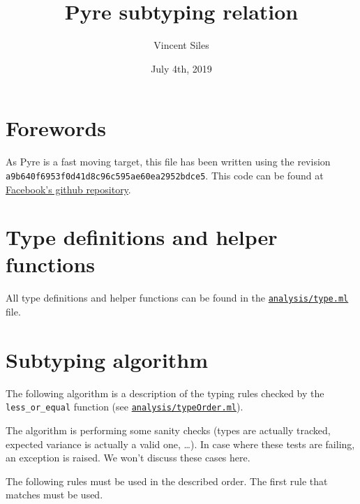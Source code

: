 \documentclass[a4paper]{article}
\newcommand{\PyreRevision}{a9b640f6953f0d41d8c96c595ae60ea2952bdce5}
\begin{document}
\title{Pyre subtyping relation}
\date{July 4th, 2019}
\author{Vincent Siles}

\maketitle

\section{Forewords}
As Pyre is a fast moving target, this file has been written using the revision
\texttt{\PyreRevision}.  This code can be found
at \href{https://github.com/facebook/pyre-check}{Facebook's github repository}.

\section{Type definitions and helper functions}
All type definitions and helper functions can be found in the
\href{https://github.com/facebook/pyre-check/tree/\PyreRevision/analysis/type.ml}{\texttt{analysis/type.ml}}
file.

\section{Subtyping algorithm}

The following algorithm is a description of the typing rules checked by
the \texttt{less\_or\_equal} function (see
\href{https://github.com/facebook/pyre-check/tree/\PyreRevision/analysis/typeOrder.ml}{\texttt{analysis/typeOrder.ml}}).

The algorithm is performing some sanity checks (types are actually
tracked, expected variance is actually a valid one, \ldots). In case where
these tests are failing, an exception is raised. We won't discuss these
cases here.

The following rules must be used in the described order. The first rule that
matches must be used.
\\
\end{document}
